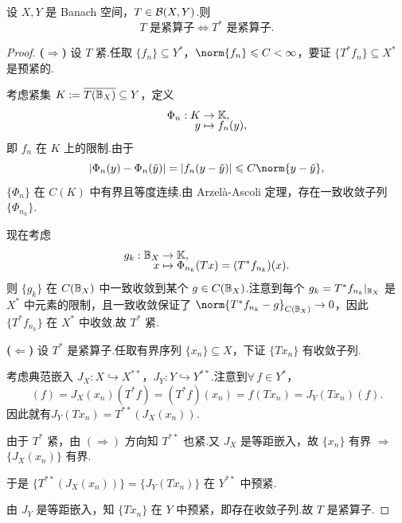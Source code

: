 \begin{theorem}[Schauder 定理]
设 $X,Y$ 是 Banach 空间，$T\in\mathcal{B}(X,Y)$.则
\begin{equation*}
T \text{ 是紧算子} \iff T^* \text{ 是紧算子}.
\end{equation*}
\end{theorem}
\begin{proof}
\textbf{($\Rightarrow$)} 设 $T$ 紧.任取 $\{f_n\}\subseteq Y^*$，$\norm{f_n}\leq C<\infty$，要证 $\{T^*f_n\}\subseteq X^*$ 是预紧的.\par
考虑紧集 $K:=\overline{T(\mathbb{B}_X)}\subseteq Y$，定义
\begin{align*}
    \Phi_n: K&\to\mathbb{K},\\[-6pt]
    y&\mapsto f_n(y),
\end{align*}
即 $f_n$ 在 $K$ 上的限制.由于
\begin{equation*}
|\Phi_n(y) - \Phi_n(\tilde{y})| = |f_n(y - \tilde{y})| \leq C\norm{y - \tilde{y}},
\end{equation*}
$\{\Phi_n\}$ 在 $C(K)$ 中有界且等度连续.由 Arzel\`a-Ascoli 定理，存在一致收敛子列 $\{\Phi_{n_k}\}$.\par
现在考虑
\begin{align*}
    g_k: \mathbb{B}_X&\to\mathbb{K},\\[-6pt]
    x&\mapsto \Phi_{n_k}(Tx) = (T^*f_{n_k})(x).
\end{align*}
则 $\{g_k\}$ 在 $C(\mathbb{B}_X)$ 中一致收敛到某个 $g\in C(\mathbb{B}_X)$.注意到每个 $g_k = T^*f_{n_k}|_{\mathbb{B}_X}$ 是 $X^*$ 中元素的限制，且一致收敛保证了 $\norm{T^*f_{n_k} - g}_{C(\mb{B}_X)}\to0$，因此 $\{T^*f_{n_k}\}$ 在 $X^*$ 中收敛.故 $T^*$ 紧.\par
\textbf{($\Leftarrow$)} 设 $T^*$ 是紧算子.任取有界序列 $\{x_n\}\subseteq X$，下证 $\{Tx_n\}$ 有收敛子列.\par
考虑典范嵌入 $J_X:X\hookrightarrow X^{**}$，$J_Y:Y\hookrightarrow Y^{**}$.注意到$\forall\, f\in Y^*$，
\begin{equation*}
[T^{**}(J_X(x_n))](f) = J_X(x_n)(T^* f) = (T^* f)(x_n) = f(Tx_n) = J_Y(Tx_n)(f).
\end{equation*}
因此就有$J_Y(Tx_n) = T^{**}(J_X(x_n)).$\par
由于 $T^*$ 紧，由 $(\Rightarrow)$ 方向知 $T^{**}$ 也紧.又 $J_X$ 是等距嵌入，故 $\{x_n\}$ 有界 $\Rightarrow$ $\{J_X(x_n)\}$ 有界.\par
于是 $\{T^{**}(J_X(x_n))\} = \{J_Y(Tx_n)\}$ 在 $Y^{**}$ 中预紧.\par
由 $J_Y$ 是等距嵌入，知 $\{Tx_n\}$ 在 $Y$ 中预紧，即存在收敛子列.故 $T$ 是紧算子.
\end{proof}

